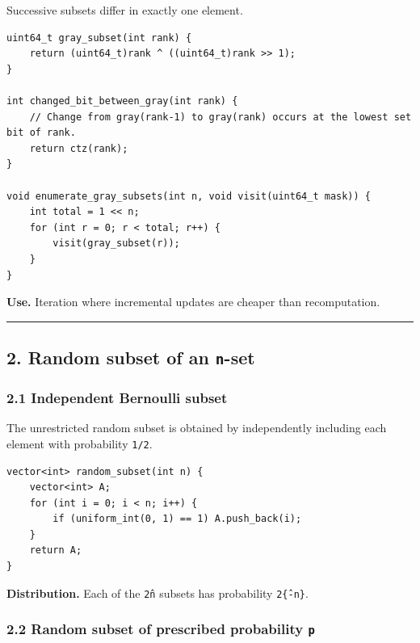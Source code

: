 \documentclass[11pt]{article}
\begin{document}
Successive subsets differ in exactly one element.

\begin{verbatim}
uint64_t gray_subset(int rank) {
    return (uint64_t)rank ^ ((uint64_t)rank >> 1);
}

int changed_bit_between_gray(int rank) {
    // Change from gray(rank-1) to gray(rank) occurs at the lowest set bit of rank.
    return ctz(rank);
}

void enumerate_gray_subsets(int n, void visit(uint64_t mask)) {
    int total = 1 << n;
    for (int r = 0; r < total; r++) {
        visit(gray_subset(r));
    }
}
\end{verbatim}

\textbf{Use.} Iteration where incremental updates are cheaper than recomputation.

\begin{center}\rule{0.5\linewidth}{0.5pt}\end{center}

\subsection{\texorpdfstring{2. Random subset of an \texttt{n}-set}{2. Random subset of an n-set}}\label{random-subset-of-an-n-set}

\subsubsection{2.1 Independent Bernoulli subset}\label{independent-bernoulli-subset}

The unrestricted random subset is obtained by independently including each element with probability \texttt{1/2}.

\begin{verbatim}
vector<int> random_subset(int n) {
    vector<int> A;
    for (int i = 0; i < n; i++) {
        if (uniform_int(0, 1) == 1) A.push_back(i);
    }
    return A;
}
\end{verbatim}

\textbf{Distribution.} Each of the \texttt{2\^n} subsets has probability \texttt{2\^\{-n\}}.

\subsubsection{\texorpdfstring{2.2 Random subset of prescribed probability \texttt{p}}{2.2 Random subset of prescribed probability p}}\label{random-subset-of-prescribed-probability-p}
\end{document}
